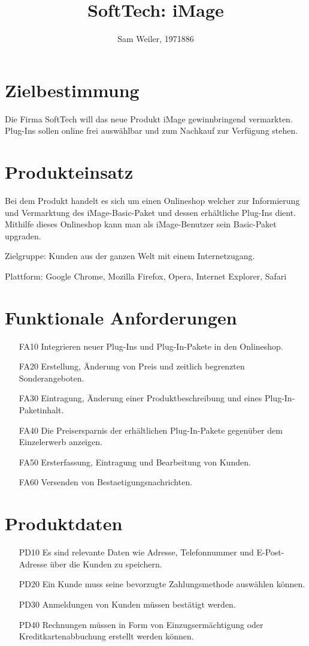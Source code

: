 \documentclass[parskip=full]{scrartcl}
\title{SoftTech: \gls{iMage}}
\author{Sam Weiler, 1971886}
\begin{document}
\maketitle
\tableofcontents

\section{Zielbestimmung}
Die Firma SoftTech will das neue Produkt \gls{iMage} gewinnbringend vermarkten. \gls{Plug-In}s sollen online frei auswählbar und zum Nachkauf zur Verfügung stehen.

\section{Produkteinsatz}
Bei dem Produkt handelt es sich um einen \gls{Onlineshop} welcher zur Informierung und Vermarktung des \gls{iMage}-Basic-Paket und dessen erhältliche \gls{Plug-In}s dient. Mithilfe dieses \gls{Onlineshop} kann man als \gls{iMage}-Benutzer sein Basic-Paket \gls{upgraden}.

Zielgruppe: \gls{Kunde}n aus der ganzen Welt mit einem Internetzugang.

Plattform: \gls{Google Chrome}, \gls{Mozilla Firefox}, \gls{Opera}, \gls{Internet Explorer}, \gls{Safari}

\section{Funktionale Anforderungen}
\begin{itemize}[nosep]
\item[FA10] Integrieren neuer \gls{Plug-In}s und \gls{Plug-In}-Pakete in den \gls{Onlineshop}.
\item[FA20] Erstellung, Änderung von Preis und zeitlich begrenzten \gls{Sonderangebot}en.
\item[FA30] Eintragung, Änderung einer Produktbeschreibung und eines \gls{Plug-In}-Paketinhalt.
\item[FA40] Die Preisersparnis der erhältlichen \gls{Plug-In}-Pakete gegenüber dem Einzelerwerb anzeigen.
\item[FA50] Ersterfassung, Eintragung und Bearbeitung von \gls{Kunde}n.
\item[FA60] Versenden von \gls{Bestaetigungsnachricht}en.
\end{itemize}

\section{Produktdaten}
\begin{itemize}[nosep]
\item[PD10] Es sind relevante Daten wie Adresse, Telefonnummer und E-Post-Adresse über die \gls{Kunde}n zu speichern.
\item[PD20] Ein \gls{Kunde} muss seine bevorzugte Zahlungsmethode auswählen können.
\item[PD30] Anmeldungen von \gls{Kunde}n müssen bestätigt werden.
\item[PD40] Rechnungen müssen in Form von Einzugsermächtigung oder Kreditkartenabbuchung erstellt werden können.
\end{itemize}
\end{document}
